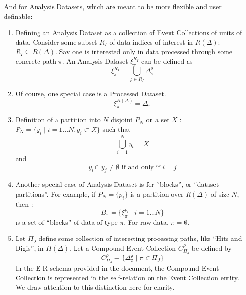 \documentclass{cmspaper}
\begin{document}
And for Analysis Datasets, which are meant to be more flexible and user definable: 

\begin{enumerate}

\item Defining an Analysis Dataset as a collection of Event Collections of units of data.  
Consider some
subset $R_I$ of data indices of interest in $R(\Delta)$:  $R_I \subseteq R(\Delta)$.
Say one is interested only in 
data processed through some concrete path $\pi$.  An Analysis Dataset $\xi_{\pi}^{R_I}$
can be defined as 
\begin{equation}
\xi_{\pi}^{R_I} = \bigcup_{\rho \in R_I} \Delta_{\pi}^{\rho}
\end{equation}

\item Of course, one special case is a Processed Dataset. 
\begin{equation} 
\xi_{\pi}^{R(\Delta)} = \Delta_{\pi}
\end{equation}


\item Definition of a partition into $N$ disjoint $P_N$ on a set $X$ : 
$ P_N = \{ y_i \mid i = 1...N, y_i \subset X \} $ such that 
\begin{equation}
\bigcup_{i=1}^N y_i = X
\end{equation} 
and 
\begin{equation} 
y_i \cap y_j \neq \emptyset \mbox{ if and only if } i = j
\end{equation}
 
\item  Another special case of Analysis Dataset 
is for ``blocks'', or ``dataset partitions''.  For example, if
$P_N = \{ p_i \}$ is a partition over $R(\Delta)$ of size $N$, then : 
\begin{equation}
B_{\pi} = \{ \xi_{\pi}^{p_i} \mid i = 1...N\}
\end{equation}
is a set of ``blocks'' of data of type $\pi$.  For raw data, $\pi = \emptyset$.


\item Let $\Pi_J$ define some collection of interesting processing paths, like ``Hits and Digis'', 
in $\Pi(\Delta)$.  Let a Compound Event Collection $C_{\Pi_J}^{\rho}$ be defined by
\begin{equation}
C_{\Pi_J}^{\rho} = \{ \Delta_{\pi}^{\rho} \mid \pi \in \Pi_J \}
\end{equation}
In the E-R schema provided in the document, the Compound Event Collection is 
represented in the self-relation on the Event Collection entity.  We draw attention to 
this distinction here for clarity.


\end{enumerate}
\end{document}
